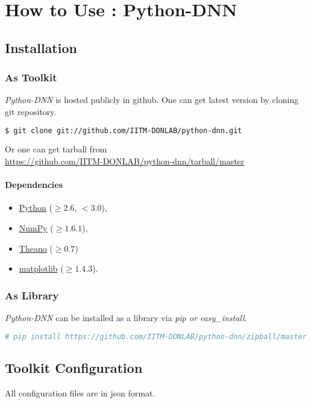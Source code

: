 \appendix
\chapter{How to Use : Python-DNN}
\label{app:pythondnn}
\section{Installation}
\subsection{As Toolkit}

\noindent \textit{Python-DNN} is hosted publicly in github.  One can get latest version by cloning git repository.
\begin{lstlisting}[language=bash,basicstyle=\small] 
$ git clone git://github.com/IITM-DONLAB/python-dnn.git
\end{lstlisting}
Or one can get tarball from \\
\url{https://github.com/IITM-DONLAB/python-dnn/tarball/master}

\subsubsection{Dependencies}
\begin{itemize}
	\item \href{https://www.python.org/downloads/}{Python} ($\geq2.6$, $< 3.0$),
	\item \href{http://www.numpy.org/}{NumPy} ($\geq 1.6.1$),
	\item \href{http://www.deeplearning.net/software/theano/install.html#install}{Theano} ($\geq 0.7$)
	\item \href{http://matplotlib.org/}{matplotlib} ($\geq 1.4.3$).
\end{itemize}

\subsection{As Library}
\textit{Python-DNN} can be installed as a library via 
\textit{pip or easy\_install}.
\begin{lstlisting}[language=bash,basicstyle=\small] 
# pip install https://github.com/IITM-DONLAB/python-dnn/zipball/master
\end{lstlisting}

\section{Toolkit Configuration} 
All configuration files are in json format.
